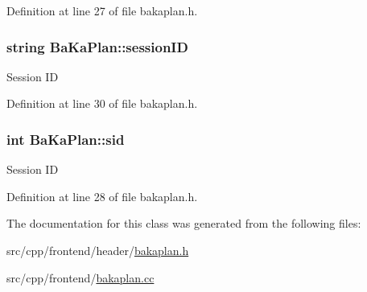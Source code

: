 Definition at line 27 of file bakaplan.\-h.

\hypertarget{classBaKaPlan_a2fcda3c2e60e6a8433dff76c6803fb30}{
\subsubsection[{session\-I\-D}]{\setlength{\rightskip}{0pt plus 5cm}string Ba\-Ka\-Plan\-::session\-I\-D\hspace{0.3cm}{\ttfamily [protected]}}}\label{classBaKaPlan_a2fcda3c2e60e6a8433dff76c6803fb30}
Session I\-D 

Definition at line 30 of file bakaplan.\-h.

\hypertarget{classBaKaPlan_ac6fc57dc646a8ff922fca7bf46764e4c}{
\subsubsection[{sid}]{\setlength{\rightskip}{0pt plus 5cm}int Ba\-Ka\-Plan\-::sid\hspace{0.3cm}{\ttfamily [protected]}}}\label{classBaKaPlan_ac6fc57dc646a8ff922fca7bf46764e4c}
Session I\-D 

Definition at line 28 of file bakaplan.\-h.



The documentation for this class was generated from the following files\-:\begin{DoxyCompactItemize}
\item 
src/cpp/frontend/header/\hyperlink{bakaplan_8h}{bakaplan.\-h}\item 
src/cpp/frontend/\hyperlink{bakaplan_8cc}{bakaplan.\-cc}\end{DoxyCompactItemize}
